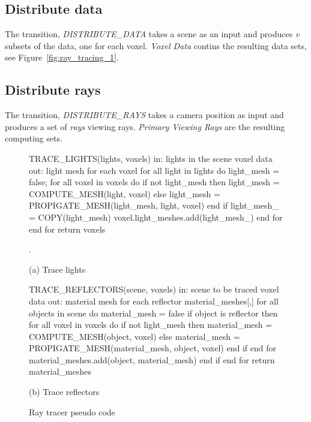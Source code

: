 \subsection{Distribute data}
The transition, \emph{DISTRIBUTE\_DATA} takes a scene as an input and produces 
\emph{v} subsets of the data, one for each voxel.  \emph{Voxel Data} contins the
resulting data sets, see Figure~\ref{fig:ray_tracing_1}.

\subsection{Distribute rays}
The transition, \emph{DISTRIBUTE\_RAYS} takes a camera position as input and
produces a set of \emph{rays} viewing rays.  \emph{Primary Viewing Rays} are the
resulting computing sets.

\begin{figure}[!htb]
\begin{algorithm}
TRACE_LIGHTS(lights, voxels) 
  in:  lights in the scene
       voxel data
  out: light mesh for each voxel
  for all light in lights do
    light_mesh = false;
    for all voxel in voxels do 
      if not light_mesh then
        light_mesh = 
          COMPUTE_MESH(light, voxel)
      else
        light_mesh = 
          PROPIGATE_MESH(light_mesh, 
                       light, voxel)
      end if
      light_mesh_ = COPY(light_mesh)
      voxel.light_meshes.add(light_mesh_)
    end for
  end for
return voxels


.
\end{algorithm}

(a) Trace lights

\endminipage\hfill
{}
\begin{algorithm}
TRACE_REFLECTORS(scene, voxels) 
  in:  scene to be traced
       voxel data
  out: material mesh for each reflector
  material_meshes[,]
  for all objects in scene do
    material_mesh = false
    if object is reflector then
      for all voxel in voxels do 
        if not light_mesh then
          material_mesh = 
            COMPUTE_MESH(object, voxel)
        else
          material_mesh = 
            PROPIGATE_MESH(material_mesh, 
                         object, voxel)
        end if
      end for
      material_meshes.add(object, 
                         material_mesh)
    end if
  end for
return material_meshes
\end{algorithm}

(b) Trace reflectors

\endminipage\hfill
\caption{Ray tracer pseudo code}
\label{fig:ray_tracing_2}
\end{figure}

